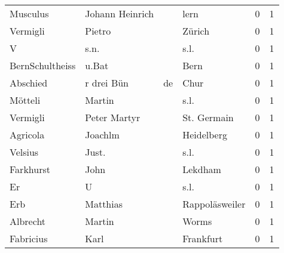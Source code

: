 \begin{center}
\begin{tiny}
\begin{longtabu}{llllrr}
                 Musculus &                    Johann Heinrich &             &                                        lern &          0 &         1 \\
                 Vermigli &                             Pietro &             &                                      Zürich &          0 &         1 \\
                        V &                               s.n. &             &                                        s.l. &          0 &         1 \\
          BernSchultheiss &                              u.Bat &             &                                        Bern &          0 &         1 \\
                 Abschied &                         r drei Bün &          de &                                        Chur &          0 &         1 \\
                  Mötteli &                             Martin &             &                                        s.l. &          0 &         1 \\
                 Vermigli &                       Peter Martyr &             &                                 St. Germain &          0 &         1 \\
                 Agricola &                            Joachlm &             &                                  Heidelberg &          0 &         1 \\
                  Velsius &                              Just. &             &                                        s.l. &          0 &         1 \\
                Farkhurst &                               John &             &                                     Lekdham &          0 &         1 \\
                       Er &                                  U &             &                                        s.l. &          0 &         1 \\
                      Erb &                           Matthias &             &                              Rappoläsweiler &          0 &         1 \\
                 Albrecht &                             Martin &             &                                       Worms &          0 &         1 \\
                Fabricius &                               Karl &             &                                   Frankfurt &          0 &         1 \\

\end{longtabu}
\end{tiny}
\end{center}
